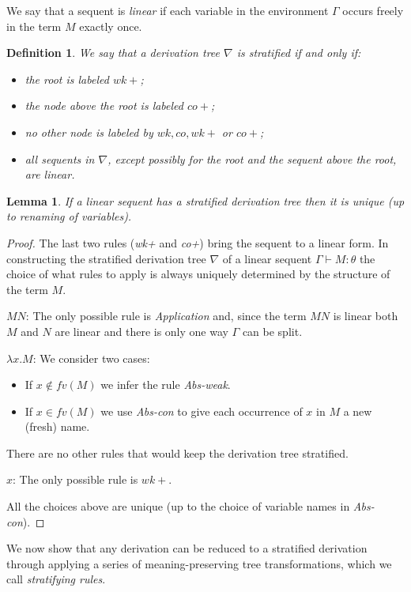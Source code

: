 \documentclass{article}
\newtheorem{definition}[theorem]{Definition}
\newtheorem{lemma}[theorem]{Lemma}
\begin{document}
We say that a sequent is \emph{linear} if each variable in the environment $\Gamma$ occurs freely in the term $M$ exactly once. 
\begin{definition}
We say that a  derivation tree $\nabla$ is \emph{stratified} if and only if:
\begin{itemize}
\item the root is labeled $wk{+}$;
\item the node above the root is labeled $co{+}$;
\item no other node is labeled by $wk, co, wk{+}$ or $co{+}$;
\item all sequents in $\nabla$, except possibly for the root and the sequent above the root, are linear. 
\end{itemize}
\end{definition}
\begin{lemma}\label{lem:struni}
If a linear sequent has a stratified derivation tree then it is unique (up to renaming of variables). 
\end{lemma}
\begin{proof}
The last two rules (\emph{wk+} and \emph{co+}) bring the sequent to a linear form. 
In constructing the stratified derivation tree $\nabla$ of a linear sequent $\Gamma\vdash M:\theta$ the choice of what rules to apply is always uniquely determined by the structure of the term $M$. 
\begin{description}
\item{$MN$:} The only possible rule is \emph{Application} and, since the term $MN$ is linear both $M$ and $N$ are linear and there is only one way $\Gamma$ can be split. 
\item{$\lambda x.M$:} We consider two cases:
\begin{itemize}
\item If $x\not\in fv(M)$ we infer the rule \emph{Abs-weak}. 
\item If $x\in fv(M)$ we use \emph{Abs-con} to give each occurrence of $x$ in $M$ a new (fresh) name.  
\end{itemize}
There are no other rules that would keep the derivation tree stratified. 
\item{$x$:} The only possible rule is $wk{+}$. 
\end{description}
All the choices above are unique (up to the choice of variable names in \emph{Abs-con}).
\end{proof}
We now show that any  derivation can be reduced to a stratified derivation through applying a series of meaning-preserving tree transformations, which we call \emph{stratifying rules}.
\end{document}
